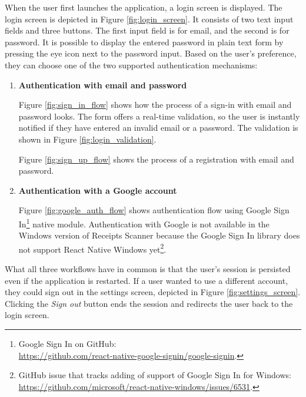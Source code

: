 \documentclass[
  digital, %
  table,   %
  oneside, %
  lof,     %
  lot,     %
]{fithesis3}
\begin{document}
When the user first launches the application, a login screen is displayed. The login screen is depicted in Figure \ref{fig:login_screen}. It consists of two text input fields and three buttons. The first input field is for email, and the second is for password. It is possible to display the entered password in plain text form by pressing the eye icon next to the password input. Based on the user's preference, they can choose one of the two supported authentication mechanisms:

\begin{enumerate}
    \item \textbf{Authentication with email and password}
    
    Figure \ref{fig:sign_in_flow} shows how the process of a sign-in with email and password looks. The form offers a real-time validation, so the user is instantly notified if they have entered an invalid email or a password. The validation is shown in Figure \ref{fig:login_validation}.
    
    Figure \ref{fig:sign_up_flow} shows the process of a registration with email and password.
    
    \item \textbf{Authentication with a Google account}
    
    \label{phantom:google_sign_in}
    Figure \ref{fig:google_auth_flow} shows authentication flow using Google Sign In\footnote{Google Sign In on GitHub:\\\url{https://github.com/react-native-google-signin/google-signin}.} native module.
    Authentication with Google is not available in the Windows version of Receipts Scanner because the Google Sign In library does not support React Native Windows yet\footnote{GitHub issue that tracks adding of support of Google Sign In for Windows: \url{https://github.com/microsoft/react-native-windows/issues/6531}.}.

\end{enumerate}

What all three workflows have in common is that the user's session is persisted even if the application is restarted.
If a user wanted to use a different account, they could sign out in the settings screen, depicted in Figure \ref{fig:settings_screen}. Clicking the \textit{Sign out} button ends the session and redirects the user back to the login screen.
\end{document}
